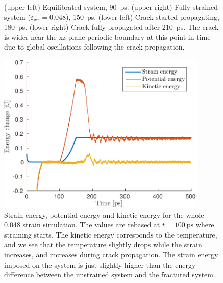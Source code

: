 \begin{figure}
\begin{minipage}[b]{0.5\linewidth}
\end{minipage}
\caption{(upper left) Equilibrated system, \SI{90}{\pico\second}. (upper right) Fully strained system ($\varepsilon_{xx} = 0.048$), \SI{150}{\pico\second}. (lower left) Crack started propagating, \SI{180}{\pico\second}. (lower right) Crack fully propagated after \SI{210}{\pico\second}. The crack is wider near the xz-plane periodic boundary at this point in time due to global oscillations following the crack propagation.}
\label{fig:crack_evolution}
\end{figure}


\begin{figure}
\centering
\includegraphics[width=10cm]{../figures/thesis/strain_pot_kin_eng_1048_24_24_12.pdf}
\caption{Strain energy, potential energy and kinetic energy for the whole 0.048 strain simulation. The values are rebased at $t=\SI{100}{\pico\second}$ where straining starts. The kinetic energy corresponds to the temperature, and we see that the temperature slightly drops while the strain increases, and increases during crack propagation. The strain energy imposed on the system is just slightly higher than the energy difference between the unstrained system and the fractured system.}
\label{fig:energy_1048}
\end{figure}


